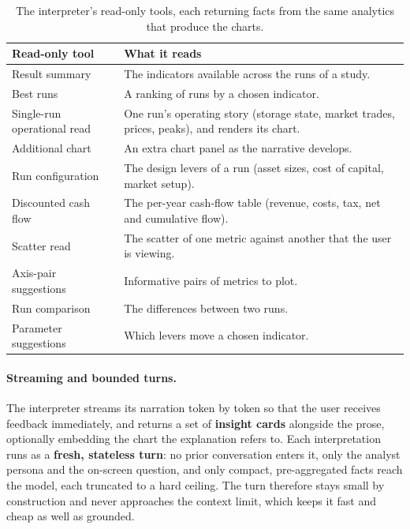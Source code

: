 \begin{table}[H]
  \centering
  \small
  \begin{tabularx}{\linewidth}{@{}>{\raggedright\arraybackslash}p{4.1cm} >{\raggedright\arraybackslash}X@{}}
    \toprule
    \textbf{Read-only tool} & \textbf{What it reads} \\
    \midrule
    Result summary & The indicators available across the runs of a study. \\
    Best runs & A ranking of runs by a chosen indicator. \\
    Single-run operational read & One run's operating story (storage state, market
      trades, prices, peaks), and renders its chart. \\
    Additional chart & An extra chart panel as the narrative develops. \\
    Run configuration & The design levers of a run (asset sizes, cost of capital,
      market setup). \\
    Discounted cash flow & The per-year cash-flow table (revenue, costs, tax, net
      and cumulative flow). \\
    Scatter read & The scatter of one metric against another that the user is
      viewing. \\
    Axis-pair suggestions & Informative pairs of metrics to plot. \\
    Run comparison & The differences between two runs. \\
    Parameter suggestions & Which levers move a chosen indicator. \\
    \bottomrule
  \end{tabularx}
  \caption{The interpreter's read-only tools, each returning facts from the same analytics that produce the charts.}
  \label{tab:interp-tools}
\end{table}

\paragraph{Streaming and bounded turns.} The interpreter streams its narration
token by token so that the user receives feedback immediately, and returns a set of
\textbf{insight cards} alongside the prose, optionally embedding the chart the
explanation refers to. Each interpretation runs as a \textbf{fresh, stateless
turn}: no prior conversation enters it, only the analyst persona and the on-screen
question, and only compact, pre-aggregated facts reach the model, each truncated to
a hard ceiling. The turn therefore stays small by construction and never approaches
the context limit, which keeps it fast and cheap as well as grounded.

